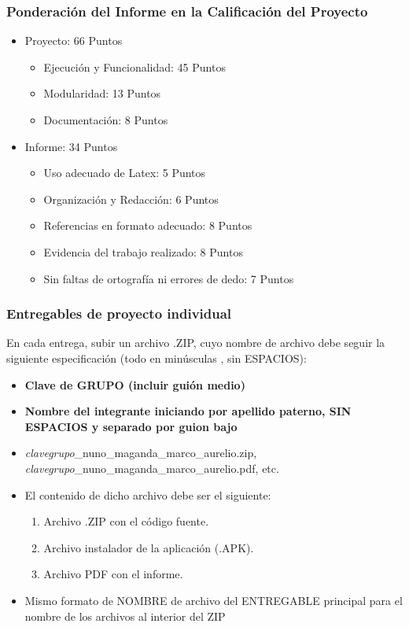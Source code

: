 \begin{frame}
\frametitle{Ponderación del Informe en la Calificación del Proyecto}
\begin{itemize}
\item Proyecto: 66 Puntos
\begin{itemize}
\item Ejecución y Funcionalidad: 45 Puntos
\item Modularidad: 13 Puntos
\item Documentación: 8 Puntos
\end{itemize}
\item Informe: 34 Puntos
\begin{itemize}
\item Uso adecuado de Latex: 5 Puntos
\item Organizaci\'on y Redacci\'on: 6 Puntos
\item Referencias en formato adecuado: 8 Puntos
\item Evidencia del trabajo realizado: 8 Puntos
\item Sin faltas de ortografía ni errores de dedo: 7 Puntos
\end{itemize}
\end{itemize}
\end{frame}










\begin{frame}
\frametitle{Entregables de proyecto individual}
En cada entrega, subir un archivo .ZIP, cuyo nombre de archivo debe seguir la siguiente especificación (todo en minúsculas , sin ESPACIOS):
\begin{itemize}
\item \textbf{Clave de GRUPO (incluir guión medio)}
\item \textbf{Nombre del integrante iniciando por apellido paterno, SIN ESPACIOS y separado por guion bajo}
\item \textit{clavegrupo}\_nuno\_maganda\_marco\_aurelio.zip,  \textit{clavegrupo}\_nuno\_maganda\_marco\_aurelio.pdf, etc. 
\end{itemize}
\begin{itemize}
\item El contenido de dicho archivo debe ser el siguiente:
\begin{enumerate}
\item Archivo .ZIP con el código fuente.
\item Archivo instalador de la aplicación (.APK).  
\item Archivo PDF con el informe. 
\end{enumerate}
\item Mismo formato de NOMBRE de archivo del ENTREGABLE principal para el nombre de los archivos al interior del ZIP
\end{itemize}

\end{frame}



